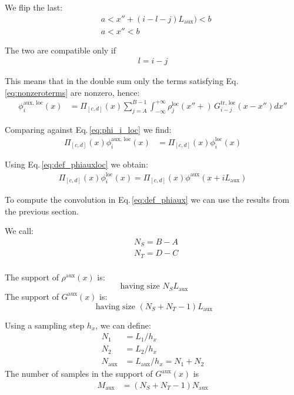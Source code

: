 We flip the last:
\begin{align}
& a < x'' +(i-l-j)L_\text{aux}) < b\\
& a < x''< b
\end{align}

The two are compatible only if
\begin{align}
l=i-j
\label{eq:nonzeroterms}
\end{align}

This means that in the double sum only the terms satisfying Eq.\,\ref{eq:nonzeroterms} are nonzero, hence:
\begin{align}
\phi^\text{aux, loc}_i(x)
&=
\Pi_{[c, d]}(x)
\sum_{j=A}^{B-1} \int_{-\infty}^{+\infty}
\rho_{j}^\text{loc}(x'' + )\,
G^\text{tr, loc}_{i-j}(x-x'')
dx''
\end{align}

Comparing against Eq.\,\ref{eq:phi_i_loc}
we find:
\begin{align}
\Pi_{[c, d]}(x)\phi^\text{aux, loc}_i(x)
&=
\Pi_{[c, d]}(x)
\phi^\text{loc}_i(x)
\end{align}

Using Eq.\,\ref{eq:def_phiauxloc} we obtain:
\begin{align}
\Pi_{[c, d]}(x)
\phi^\text{loc}_i(x)
=
\Pi_{[c, d]}(x)\phi^\text{aux}(x + iL_\text{aux}) 
\end{align}

To compute the convolution in Eq.\,\ref{eq:def_phiaux} we can use the results from the previous section.

We call:
\begin{align}
&N_S = B-A\\
&N_T = D-C\\
\end{align}

The support of $\rho^\text{aux}(x)$ is:
\begin{equation}
[a +AL_\text{aux}, a + B L_\text{aux}]
\text{  having size  } N_S  L_\text{aux}
\end{equation}
The support of $G^\text{aux}(x)$ is:
\begin{equation}
[c-b +(C-B+1)L_\text{aux}, c-b + (D-A) L_\text{aux}]
\text{  having size  } \left(N_S + N_T -1\right) L_\text{aux}
\end{equation}

Using a sampling step $h_x$, we can define:
\begin{align}
N_1 &= L_1 / h_x\\
N_2 &= L_2 / h_x\\
N_\text{aux} &= L_\text{aux} / h_x = N_1+N_2
\end{align}
The number of samples in the support of $G^\text{aux}(x)$ is
\begin{align}
M_\text{aux} &= (N_S+N_T-1)N_\text{aux} 
\end{align}




